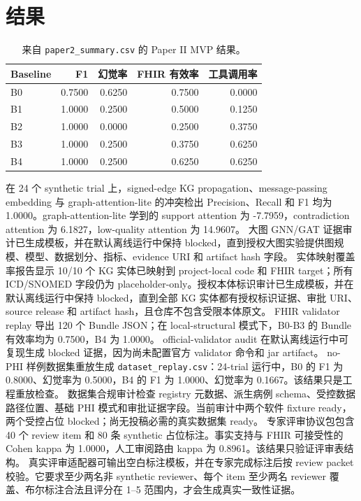 \documentclass[11pt]{article}
\begin{document}
\section{结果}
\begin{table}[h]
\centering
\caption{来自 \texttt{paper2\_summary.csv} 的 Paper II MVP 结果。}
\begin{tabular}{lrrrr}
\toprule
Baseline & F1 & 幻觉率 & FHIR 有效率 & 工具调用率 \\
\midrule
B0 & 0.7500 & 0.6250 & 0.7500 & 0.0000 \\
B1 & 1.0000 & 0.2500 & 0.5000 & 0.1250 \\
B2 & 1.0000 & 0.0000 & 0.2500 & 0.3750 \\
B3 & 1.0000 & 0.2500 & 0.3750 & 0.6250 \\
B4 & 1.0000 & 0.2500 & 0.6250 & 0.6250 \\
\bottomrule
\end{tabular}
\end{table}
在 24 个 synthetic trial 上，signed-edge KG propagation、message-passing embedding 与 graph-attention-lite 的冲突检出 Precision、Recall 和 F1 均为 1.0000。graph-attention-lite 学到的 support attention 为 -7.7959，contradiction attention 为 6.1827，low-quality attention 为 14.9607。
大图 GNN/GAT 证据审计已生成模板，并在默认离线运行中保持 blocked，直到授权大图实验提供图规模、模型、数据划分、指标、evidence URI 和 artifact hash 字段。
实体映射覆盖率报告显示 10/10 个 KG 实体已映射到 project-local code 和 FHIR target；所有 ICD/SNOMED 字段仍为 placeholder-only。授权本体标识审计已生成模板，并在默认离线运行中保持 blocked，直到全部 KG 实体都有授权标识证据、审批 URI、source release 和 artifact hash，且仓库不包含受限本体原文。
FHIR validator replay 导出 120 个 Bundle JSON；在 local-structural 模式下，B0-B3 的 Bundle 有效率均为 0.7500，B4 为 1.0000。
official-validator audit 在默认离线运行中可复现生成 blocked 证据，因为尚未配置官方 validator 命令和 jar artifact。
no-PHI 样例数据集重放生成 \texttt{dataset\_replay.csv}：24-trial 运行中，B0 的 F1 为 0.8000、幻觉率为 0.5000，B4 的 F1 为 1.0000、幻觉率为 0.1667。该结果只是工程重放检查。
数据集合规审计检查 registry 元数据、派生病例 schema、受控数据路径位置、基础 PHI 模式和审批证据字段。当前审计中两个软件 fixture ready，两个受控占位 blocked；尚无投稿必需的真实数据集 ready。
专家评审协议包包含 40 个 review item 和 80 条 synthetic 占位标注。事实支持与 FHIR 可接受性的 Cohen kappa 为 1.0000，人工审阅路由 kappa 为 0.8961。该结果只验证评审表结构。
真实评审适配器可输出空白标注模板，并在专家完成标注后按 review packet 校验。它要求至少两名非 synthetic reviewer、每个 item 至少两名 reviewer 覆盖、布尔标注合法且评分在 1--5 范围内，才会生成真实一致性证据。
\end{document}
